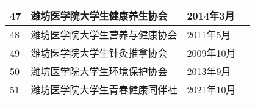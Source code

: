 \begin{center}
\begin{tabular}{|>{\centering\arraybackslash}p{2em}|>{\centering\arraybackslash}p{22em}|%
        >{\centering\arraybackslash}p{6em}|>{\centering\arraybackslash}p{5em}|}
        \cline{1-3}
        47 & 潍坊医学院大学生健康养生协会    & 2014年3月  &                        \\
        \cline{1-3}
        48 & 潍坊医学院大学生营养与健康协会   & 2011年5月  &                        \\
        \cline{1-3}
        49 & 潍坊医学院大学生针灸推拿协会    & 2009年10月 &                        \\
        \cline{1-3}
        50 & 潍坊医学院大学生环境保护协会    & 2013年9月  &                        \\
        \cline{1-3}
        51 & 潍坊医学院大学生青春健康同伴社   & 2021年10月 &                        \\
        \Xhline{1.2pt}
    \end{tabular}
\end{center}
